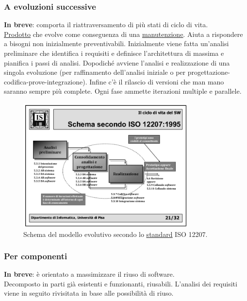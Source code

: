 			\subsubsection{A evoluzioni successive} 
			\textbf{In breve}: comporta il riattraversamento di più stati di ciclo di vita. \\ 
			 \underline{\hyperref[prodotto]{Prodotto}} che evolve come conseguenza di una \underline{\hyperref[manutenzione]{manutenzione}}. Aiuta a rispondere a bisogni non inizialmente preventivabili. Inizialmente viene fatta un'analisi preliminare che identifica i requisiti e definisce l'architettura di massima e pianifica i passi di analisi. Dopodiché avviene l'analisi e realizzazione di una singola evoluzione (per raffinamento dell'analisi iniziale o per progettazione-codifica-prove-integrazione). Infine c'è il rilascio di versioni che man mano saranno sempre più complete. Ogni fase ammette iterazioni multiple e parallele.
			 
			 \begin{figure}[H]
			 	\centering
			 	\includegraphics[width=0.8\textwidth]{img/evoluzione}		
			 	\caption{Schema del modello evolutivo secondo lo \underline{\hyperref[standard]{standard}} ISO 12207.}
			 \end{figure} 	
			
			\subsubsection{Per componenti} 
			\textbf{In breve}: è orientato a massimizzare il riuso di software. \\
			 Decomposto in parti già esistenti e funzionanti, riusabili. L'analisi dei requisiti viene in seguito rivisitata in base alle possibilità di riuso.
			
